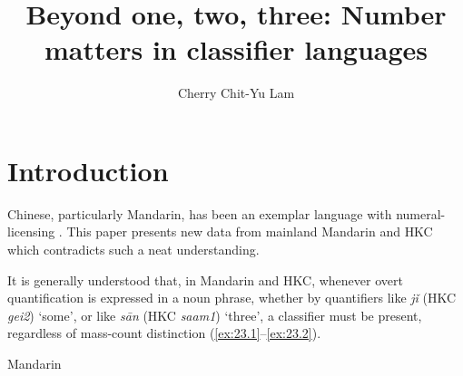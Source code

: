 \documentclass[output=paper]{langsci/langscibook}
\author{Cherry Chit-Yu Lam\affiliation{The Open University of Hong Kong}}
\title{Beyond one, two, three: Number matters in classifier languages}
\begin{document}
\glsresetall

\section{Introduction}

Chinese, particularly Mandarin, has been an exemplar
language with numeral-licensing . This paper presents new data from
mainland Mandarin and \gls{HKC} which contradicts such
a neat understanding.

It is generally understood that, in Mandarin and \gls{HKC}, whenever overt quantification is expressed in a noun phrase,
whether by quantifiers like \emph{jǐ} (\gls{HKC} \emph{gei2}) ‘some’, or
 like \emph{sān} (\gls{HKC} \emph{saam1}) ‘three’, a
classifier must be present, regardless of mass-count
distinction (\ref{ex:23.1}--\ref{ex:23.2}).\largerpage[2]

\ea\label{ex:23.1}Mandarin \parencites[92]{Chierchia1998}[519]{ChengSybesma1999} %
\z
\end{document}
